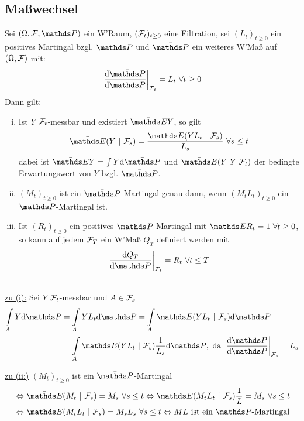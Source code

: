 \subsection{Maßwechsel}
\label{sub:masswechsel}
Sei $(\Omega,\F,\Pw)$ ein W'Raum, $(\mathcal{F}_t)_{t\ge 0}$ eine Filtration, sei $(L_t)_{t\ge0}$ ein positives Martingal bzgl. $\Pw$ und $\bar{\Pw}$ ein weiteres W'Maß auf $(\Omega,\mathcal{F})$ mit:
\[
\left.\frac{\dint \bar{\Pw}}{\dint \Pw}\right|_{\F_t}=L_t~\forall t\ge 0
\]
Dann gilt:
\begin{enumerate}[(i)]
	\item Ist $Y$ $\mathcal{F}_t$-messbar und existiert $\bar{\E}Y$, so gilt
	\[
	\bar{\E}(Y~|~\F_s)=\frac{\E(YL_t~|~\F_s)}{L_s}~\forall s\le t
	\]
	dabei ist $\bar{\E}Y=\int Y\dint \bar{\Pw}$ und $\bar{\E}(Y~Y~\F_t)$ der bedingte Erwartungswert von $Y$ bzgl. $\bar{\Pw}$.
	\item $(M_t)_{t\ge0}$ ist ein $\bar{\Pw}$-Martingal genau dann, wenn $(M_tL_t)_{t\ge0}$ ein $\Pw$-Martingal ist.
	\item Ist $(R_t)_{t\ge 0}$ ein positives $\Pw$-Martingal mit $\E R_t=1~\forall t\ge 0$, so kann auf jedem $\mathcal{F}_T$ ein W'Maß $Q_T$ definiert werden mit
	\[
	\left.\frac{\dint Q_T}{\dint \Pw}\right|_{\F_t}=R_t~\forall t\le T
	\]
\end{enumerate}

\\
\uline{zu (i):}
Sei $Y$ $\mathcal{F}_t$-messbar und $A\in \mathcal{F}_s$
\begin{equation*}
\begin{aligned}
	\int\ablim{A}Y\dint \Pw &= \int\ablim{A}YL_t\dint\Pw = \int\ablim{A}\E(YL_t~|~\F_s)\dint\Pw\\
	&= \int\ablim{A}\E(YL_t~|~\F_s)\frac{1}{L_s}\dint\bar{\Pw}, \text{ da } \left.\frac{\dint \bar{\Pw}}{\dint \Pw}\right|_{\F_s}=L_s
\end{aligned}
\end{equation*}

\uline{zu (ii:)}
$(M_t)_{t\ge0}$ ist ein $\bar{\Pw}$-Martingal
\begin{equation*}
\begin{aligned}
	&\Leftrightarrow \bar{\E}(M_t~|~\F_s)=M_s~\forall s\le t \Leftrightarrow \E(M_tL_t~|~\F_s)\frac{1}{L}=M_s~\forall s\le t\\
	&\Leftrightarrow \E(M_tL_t~|~\F_s)=M_sL_s~\forall s\le t \Leftrightarrow ML \text{ ist ein }\Pw\text{-Martingal}
\end{aligned}
\end{equation*}

